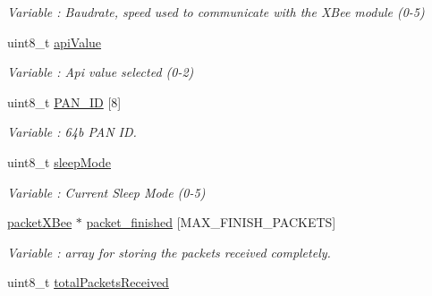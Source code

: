 \begin{DoxyCompactItemize}
\begin{DoxyCompactList}\small\item\em Variable \+: Baudrate, speed used to communicate with the X\+Bee module (0-\/5) \end{DoxyCompactList}\item 
uint8\+\_\+t \hyperlink{class_wasp_x_bee_core_ae059075f076ade4fbfcdb276154bdd24}{api\+Value}\hypertarget{class_wasp_x_bee_core_ae059075f076ade4fbfcdb276154bdd24}{}\label{class_wasp_x_bee_core_ae059075f076ade4fbfcdb276154bdd24}

\begin{DoxyCompactList}\small\item\em Variable \+: Api value selected (0-\/2) \end{DoxyCompactList}\item 
uint8\+\_\+t \hyperlink{class_wasp_x_bee_core_a6d7e9493c61b5e1907fe322bc78d8b1c}{P\+A\+N\+\_\+\+ID} \mbox{[}8\mbox{]}\hypertarget{class_wasp_x_bee_core_a6d7e9493c61b5e1907fe322bc78d8b1c}{}\label{class_wasp_x_bee_core_a6d7e9493c61b5e1907fe322bc78d8b1c}

\begin{DoxyCompactList}\small\item\em Variable \+: 64b P\+AN ID. \end{DoxyCompactList}\item 
uint8\+\_\+t \hyperlink{class_wasp_x_bee_core_a5923b366bb0b92890e065116f608e418}{sleep\+Mode}\hypertarget{class_wasp_x_bee_core_a5923b366bb0b92890e065116f608e418}{}\label{class_wasp_x_bee_core_a5923b366bb0b92890e065116f608e418}

\begin{DoxyCompactList}\small\item\em Variable \+: Current Sleep Mode (0-\/5) \end{DoxyCompactList}\item 
\hyperlink{structpacket_x_bee}{packet\+X\+Bee} $\ast$ \hyperlink{class_wasp_x_bee_core_a45d35824b939b376dc811daafcfecf0e}{packet\+\_\+finished} \mbox{[}M\+A\+X\+\_\+\+F\+I\+N\+I\+S\+H\+\_\+\+P\+A\+C\+K\+E\+TS\mbox{]}\hypertarget{class_wasp_x_bee_core_a45d35824b939b376dc811daafcfecf0e}{}\label{class_wasp_x_bee_core_a45d35824b939b376dc811daafcfecf0e}

\begin{DoxyCompactList}\small\item\em Variable \+: array for storing the packets received completely. \end{DoxyCompactList}\item 
uint8\+\_\+t \hyperlink{class_wasp_x_bee_core_a114316a6258a90f1bc58f6e1811ae7fc}{total\+Packets\+Received}\hypertarget{class_wasp_x_bee_core_a114316a6258a90f1bc58f6e1811ae7fc}{}\label{class_wasp_x_bee_core_a114316a6258a90f1bc58f6e1811ae7fc}


\end{DoxyCompactItemize}
